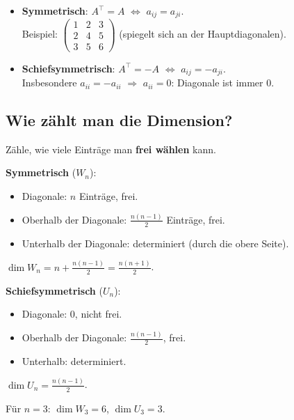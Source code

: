 \documentclass[a4paper,12pt]{article}
\begin{document}
\begin{merkbox}[title={Definitionen}]
\begin{itemize}[nosep]
    \item \textbf{Symmetrisch}: $A^\top = A$ \quad $\iff$ \quad $a_{ij} = a_{ji}$. \\
    Beispiel: $\begin{pmatrix} 1 & 2 & 3 \\ 2 & 4 & 5 \\ 3 & 5 & 6 \end{pmatrix}$ (spiegelt sich an der Hauptdiagonalen).
    \item \textbf{Schiefsymmetrisch}: $A^\top = -A$ \quad $\iff$ \quad $a_{ij} = -a_{ji}$. \\
    Insbesondere $a_{ii} = -a_{ii}$ $\Rightarrow$ $a_{ii} = 0$: Diagonale ist immer $0$.
\end{itemize}
\end{merkbox}

\subsection*{Wie z\"ahlt man die Dimension?}

\begin{merkbox}[title={Z\"ahltrick}]
Z\"ahle, wie viele Eintr\"age man \textbf{frei w\"ahlen} kann.

\medskip
\textbf{Symmetrisch} ($W_n$):
\begin{itemize}[nosep]
    \item Diagonale: $n$ Eintr\"age, frei.
    \item Oberhalb der Diagonale: $\tfrac{n(n-1)}{2}$ Eintr\"age, frei.
    \item Unterhalb der Diagonale: determiniert (durch die obere Seite).
\end{itemize}
$\dim W_n = n + \tfrac{n(n-1)}{2} = \tfrac{n(n+1)}{2}$.

\medskip
\textbf{Schiefsymmetrisch} ($U_n$):
\begin{itemize}[nosep]
    \item Diagonale: $0$, nicht frei.
    \item Oberhalb der Diagonale: $\tfrac{n(n-1)}{2}$, frei.
    \item Unterhalb: determiniert.
\end{itemize}
$\dim U_n = \tfrac{n(n-1)}{2}$.
\end{merkbox}

F\"ur $n = 3$: $\dim W_3 = 6$, $\dim U_3 = 3$.
\end{document}
